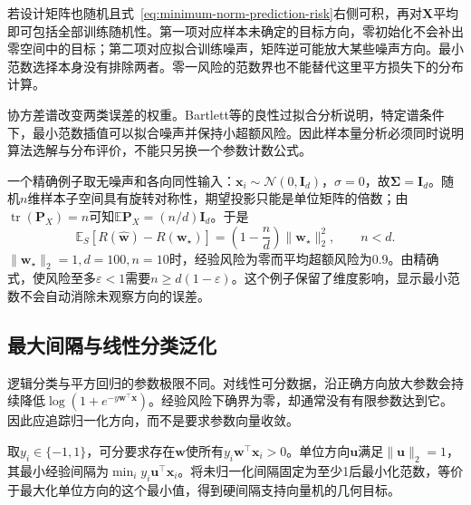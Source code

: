 若设计矩阵也随机且式~\eqref{eq:minimum-norm-prediction-risk}右侧可积，再对$\bm X$平均即可包括全部训练随机性。第一项对应样本未确定的目标方向，零初始化不会补出零空间中的目标；第二项对应拟合训练噪声，矩阵逆可能放大某些噪声方向。最小范数选择本身没有排除两者。零一风险的范数界也不能替代这里平方损失下的分布计算。

协方差谱改变两类误差的权重。Bartlett等的良性过拟合分析说明，特定谱条件下，最小范数插值可以拟合噪声并保持小超额风险。因此样本量分析必须同时说明算法选解与分布评价，不能只另换一个参数计数公式。

一个精确例子取无噪声和各向同性输入：$\bm x_i\sim\mathcal N(0,\bm I_d)$，$\sigma=0$，故$\bm\Sigma=\bm I_d$。随机$n$维样本子空间具有旋转对称性，期望投影只能是单位矩阵的倍数；由$\operatorname{tr}(\bm P_X)=n$可知$\mathbb E\bm P_X=(n/d)\bm I_d$。于是
\begin{equation}
 \mathbb E_S[R(\hat{\bm w})-R(\bm w_\star)]
 =\left(1-\frac nd\right)\|\bm w_\star\|_2^2,
 \qquad n<d.
 \label{eq:isotropic-minimum-norm-risk}
\end{equation}
$\|\bm w_\star\|_2=1,d=100,n=10$时，经验风险为零而平均超额风险为0.9。由精确式，使风险至多$\varepsilon<1$需要$n\geq d(1-\varepsilon)$。这个例子保留了维度影响，显示最小范数不会自动消除未观察方向的误差。

\subsection{最大间隔与线性分类泛化}

逻辑分类与平方回归的参数极限不同。对线性可分数据，沿正确方向放大参数会持续降低$\log(1+e^{-y\bm w^\top\bm x})$。经验风险下确界为零，却通常没有有限参数达到它。因此应追踪归一化方向，而不是要求参数向量收敛。

取$y_i\in\{-1,1\}$，可分要求存在$\bm w$使所有$y_i\bm w^\top\bm x_i>0$。单位方向$\bm u$满足$\|\bm u\|_2=1$，其最小经验间隔为$\min_i y_i\bm u^\top\bm x_i$。将未归一化间隔固定为至少1后最小化范数，等价于最大化单位方向的这个最小值，得到硬间隔支持向量机的几何目标。

